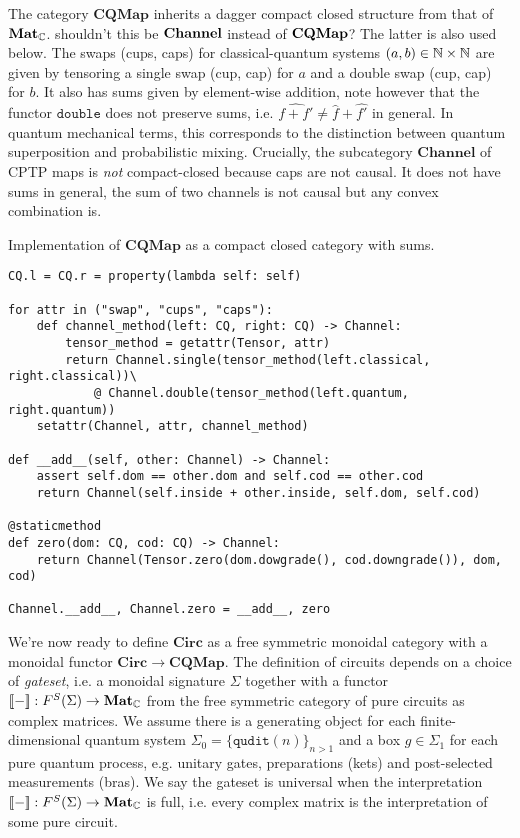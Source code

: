 The category $\mathbf{CQMap}$ inherits a dagger compact closed structure from that of $\mathbf{Mat}_{\mathbb{C}}$.
{\blue shouldn't this be $\bf{Channel}$ instead of $\bf{CQMap}$? The latter is also used below.}
The swaps (cups, caps) for classical-quantum systems $(a, b) \in \mathbb{N} \times \mathbb{N}$ are given by tensoring a single swap (cup, cap) for $a$ and a double swap (cup, cap) for $b$.
It also has sums given by element-wise addition, note however that the functor $\mathtt{double}$ does not preserve sums, i.e. $\widehat{f + f'} \neq \widehat{f} + \widehat{f'}$ in general.
In quantum mechanical terms, this corresponds to the distinction between
quantum superposition and probabilistic mixing.
Crucially, the subcategory $\mathbf{Channel}$ of CPTP maps is \emph{not} compact-closed because caps are not causal.
It does not have sums in general, the sum of two channels is not causal but any convex combination is.

\begin{python}
{\normalfont Implementation of $\mathbf{CQMap}$ as a compact closed category with sums.}

\begin{verbatim}
CQ.l = CQ.r = property(lambda self: self)

for attr in ("swap", "cups", "caps"):
    def channel_method(left: CQ, right: CQ) -> Channel:
        tensor_method = getattr(Tensor, attr)
        return Channel.single(tensor_method(left.classical, right.classical))\
            @ Channel.double(tensor_method(left.quantum, right.quantum))
    setattr(Channel, attr, channel_method)

def __add__(self, other: Channel) -> Channel:
    assert self.dom == other.dom and self.cod == other.cod
    return Channel(self.inside + other.inside, self.dom, self.cod)

@staticmethod
def zero(dom: CQ, cod: CQ) -> Channel:
    return Channel(Tensor.zero(dom.dowgrade(), cod.downgrade()), dom, cod)

Channel.__add__, Channel.zero = __add__, zero
\end{verbatim}
\end{python}

We're now ready to define $\mathbf{Circ}$ as a free symmetric monoidal category with a monoidal functor $\mathbf{Circ} \to \mathbf{CQMap}$.
The definition of circuits depends on a choice of \emph{gateset}, i.e. a monoidal signature $\Sigma$ together with a functor $[\![-]\!] : F^S(\Sigma) \to \mathbf{Mat}_{\mathbb{C}}$ from the free symmetric category of pure circuits as complex matrices.
We assume there is a generating object for each finite-dimensional quantum system $\Sigma_0 = \{ \mathtt{qudit}(n) \}_{n > 1}$ and a box $g \in \Sigma_1$ for each pure quantum process, e.g. unitary gates, preparations (kets) and post-selected measurements (bras).
We say the gateset is universal when the interpretation $[\![-]\!] : F^S(\Sigma) \to \mathbf{Mat}_{\mathbb{C}}$ is full, i.e. every complex matrix is the interpretation of some pure circuit.

